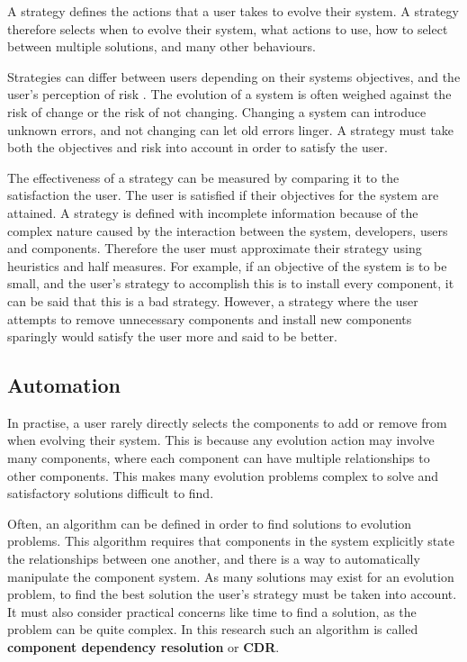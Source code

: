 A strategy defines the actions that a user takes to evolve their system.
A strategy therefore selects when to evolve their system, what actions to use, how to select between multiple solutions, and many other behaviours.

Strategies can differ between users depending on their systems objectives, and the user's perception of risk \citep{iso2009}.
The evolution of a system is often weighed against the risk of change or the risk of not changing.
Changing a system can introduce unknown errors, and not changing can let old errors linger. 
A strategy must take both the objectives and risk into account in order to satisfy the user.

The effectiveness of a strategy can be measured by comparing it to the satisfaction the user.
The user is satisfied if their objectives for the system are attained.
A strategy is defined with incomplete information because of the complex nature caused by the interaction between the system, developers, users and components.
Therefore the user must approximate their strategy using heuristics and half measures.
For example, if an objective of the system is to be small, and the user's strategy to accomplish this is to install every component, it can be said that this is a bad strategy. 
However, a strategy where the user attempts to remove unnecessary components and install new components sparingly would satisfy the user more and said to be better.

\subsection{Automation}
In practise, a user rarely directly selects the components to add or remove from when evolving their system.
This is because any evolution action may involve many components, where each component can have multiple relationships to other components.
This makes many evolution problems complex to solve and satisfactory solutions difficult to find.

Often, an algorithm can be defined in order to find solutions to evolution problems.
This algorithm requires that components in the system explicitly state the relationships between one another, and there is a way to automatically manipulate the component system.
As many solutions may exist for an evolution problem, to find the best solution the user's strategy must be taken into account.
It must also consider practical concerns like time to find a solution, as the problem can be quite complex.
In this research such an algorithm is called \textbf{component dependency resolution} or \textbf{CDR}.

